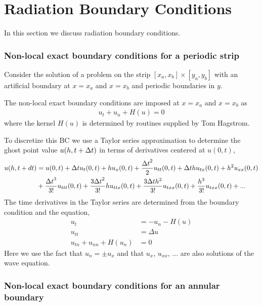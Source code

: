 \section{Radiation Boundary Conditions}

In this section we discuss radiation boundary conditions. 


\subsubsection{Non-local exact boundary conditions for a periodic strip}

Consider the solution of a problem on the strip $[x_a,x_b]\times[y_a,y_b]$
with an artificial boundary at $x=x_a$ and $x=x_b$ and periodic boundaries in $y$. 

The non-local exact boundary conditions are imposed at $x=x_a$ and $x=x_b$ as
\begin{align*}
   u_t + u_n + H(u) = 0 
\end{align*}
where the kernel $H(u)$ is determined by routines supplied by Tom Hagstrom.



To discretize this BC we use a Taylor series approximation to determine the
ghost point value $u(h,t+{\Delta t})$ in terms of derivatives centered at $u(0,t)$,
\begin{align*}
   u(h,t+dt) &= u(0,t) + {\Delta t} u_t(0,t) + h u_x(0,t) 
              + {{\Delta t}^2\over 2} u_{tt}(0,t) + {\Delta t} h u_{tx}(0,t) + h^2 u_{xx}(0,t) \\
             & + {{\Delta t}^3\over 3!} u_{ttt}(0,t) + {3{\Delta t}^2\over 3!} h u_{ttx}(0,t) 
                    + {3{\Delta t} h^2\over 3!} u_{txx}(0,t) + {h^3\over 3!} u_{txx}(0,t) + ...
\end{align*}
The time derivatives in the Taylor series are determined from the boundary condition 
and the equation,
\begin{align*}
   u_t & = -u_n - H(u) \\
   u_{tt} &= \Delta u \\
   u_{tn} + u_{nn} + H(u_n) & = 0
\end{align*}
Here we use the fact that $u_n=\pm u_x$ and that $u_x$, $u_{xx}$, ... are also solutions
of the wave equation. 

\subsubsection{Non-local exact boundary conditions for an annular boundary}


